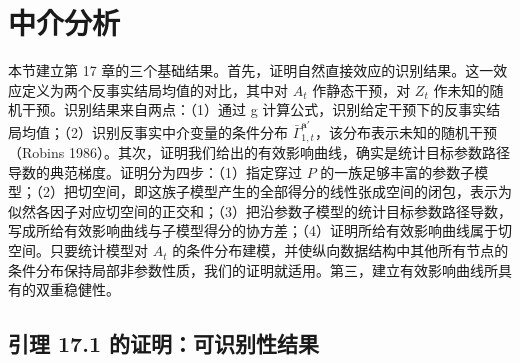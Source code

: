 
\providecommand{\appba}{\mathbf a}
\providecommand{\appbap}{\mathbf a'}
\providecommand{\appbR}{\mathbf R}
\providecommand{\appbL}{\mathbf L}
\providecommand{\appbZ}{\mathbf Z}
\providecommand{\appbA}{\mathbf A}
\providecommand{\appbr}{\mathbf r}
\providecommand{\appbl}{\mathbf l}
\providecommand{\appbz}{\mathbf z}
\providecommand{\appGam}{\bar\Gamma^{\mathbf a'}}
\providecommand{\appMedProduct}{p_{L_0}(l_0)\mathbf P_R(\appbr\mid\appba,\appbz,\appbl)\mathbf P_Z(\appbz\mid\appbap,\appbr,\appbl)\mathbf P_L(\appbl\mid\appba,\appbr,\appbz)}

\section{中介分析}

本节建立第 17 章的三个基础结果。首先，证明自然直接效应的识别结果。这一效应定义为两个反事实结局均值的对比，其中对 $A_t$ 作静态干预，对 $Z_t$ 作未知的随机干预。识别结果来自两点：（1）通过 g 计算公式，识别给定干预下的反事实结局均值；（2）识别反事实中介变量的条件分布 $\bar\Gamma_{1,t}^{\appbap}$，该分布表示未知的随机干预（Robins 1986）。其次，证明我们给出的有效影响曲线，确实是统计目标参数路径导数的典范梯度。证明分为四步：（1）指定穿过 $P$ 的一族足够丰富的参数子模型；（2）把切空间，即这族子模型产生的全部得分的线性张成空间的闭包，表示为似然各因子对应切空间的正交和；（3）把沿参数子模型的统计目标参数路径导数，写成所给有效影响曲线与子模型得分的协方差；（4）证明所给有效影响曲线属于切空间。只要统计模型对 $A_t$ 的条件分布建模，并使纵向数据结构中其他所有节点的条件分布保持局部非参数性质，我们的证明就适用。第三，建立有效影响曲线所具有的双重稳健性。

\subsection{引理 17.1 的证明：可识别性结果}

